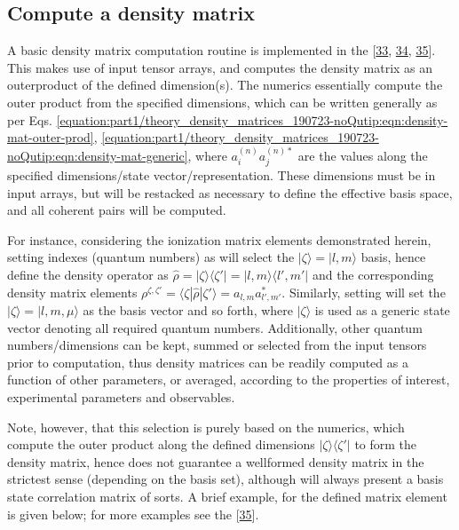 \documentclass[letterpaper,table,10pt,english]{jupyterBook}
\begin{document}
\subsection{Compute a density matrix}
\label{\detokenize{part1/theory_density_matrices_190723-noQutip:compute-a-density-matrix}}
\sphinxAtStartPar
A basic density matrix computation routine is implemented in the  {[}\hyperlink{cite.backmatter/bibliography:id664}{33}, \hyperlink{cite.backmatter/bibliography:id606}{34}, \hyperlink{cite.backmatter/bibliography:id604}{35}{]}. This makes use of input tensor arrays, and computes the density matrix as an outer\sphinxhyphen{}product of the defined dimension(s). The numerics essentially compute the outer product from the specified dimensions, which can be written generally as per Eqs. \eqref{equation:part1/theory_density_matrices_190723-noQutip:eqn:density-mat-outer-prod}, \eqref{equation:part1/theory_density_matrices_190723-noQutip:eqn:density-mat-generic}, where \(a_{i}^{(n)}a_{j}^{(n)*}\) are the values along the specified dimensions/state vector/representation. These dimensions must be in input arrays, but will be restacked as necessary to define the effective basis space, and all coherent pairs will be computed.

\sphinxAtStartPar
For instance, considering the ionization matrix elements demonstrated herein, setting indexes (quantum numbers) as \sphinxcode{\sphinxupquote{{[}l,m{]}}} will select the \(|\zeta\rangle = |l,m\rangle\) basis, hence define the density operator as \(\hat{\rho} = |\zeta\rangle \langle\zeta'| = |l,m\rangle\langle l',m'|\) and the corresponding density matrix elements \(\rho^{\zeta,\zeta'}=\langle\zeta|\hat{\rho}|\zeta'\rangle=a_{l,m}a_{l',m'}^{*}\). Similarly, setting \sphinxcode{\sphinxupquote{{[}'l','m','mu'{]}}} will set the \(|\zeta\rangle = |l,m,\mu\rangle\) as the basis vector and so forth, where \(|\zeta\rangle\) is used as a generic state vector denoting all required quantum numbers. Additionally, other quantum numbers/dimensions can be kept, summed or selected from the input tensors prior to computation, thus density matrices can be readily computed as a function of other parameters, or averaged, according to the properties of interest, experimental parameters and observables.

\sphinxAtStartPar
Note, however, that this selection is purely based on the numerics, which compute the outer product along the defined dimensions \(|\zeta\rangle\langle\zeta'|\) to form the density matrix, hence does not guarantee a well\sphinxhyphen{}formed density matrix in the strictest sense (depending on the basis set), although will always present a basis state correlation matrix of sorts. A brief example, for the  defined matrix element is given below; for more examples see the  {[}\hyperlink{cite.backmatter/bibliography:id604}{35}{]}.
\end{document}
